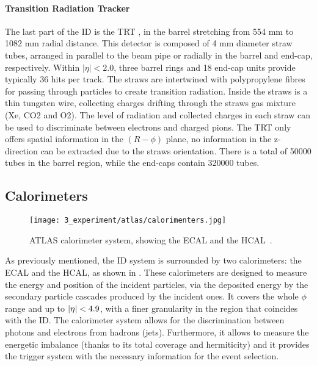 \paragraph{Transition Radiation Tracker}
The last part of the \ac{ID} is the \ac{TRT} \cite{TRTDesignPerformance}, in the barrel stretching from 554 mm to 1082 mm radial distance. This detector is composed of 4 mm diameter straw tubes, arranged in parallel to the beam pipe or radially in the barrel and end-cap, respectively. Within $|\eta| < 2.0$, three barrel rings and 18 end-cap units provide typically 36 hits per track. The straws are intertwined with polypropylene fibres for passing through particles to create transition radiation. Inside the straws is a thin tungsten wire, collecting charges drifting through the straws gas mixture (Xe, CO2 and O2). The level of radiation and collected charges in each straw can be used to discriminate between electrons and charged pions.  The \ac{TRT} only offers spatial information in the $(R-\phi)$ plane, no information in the z-direction can be extracted due to the straws orientation. There is a total of 50000 tubes in the barrel region, while the end-caps contain 320000 tubes.








\subsection{Calorimeters}

\begin{figure}[ht!]
    \centering
    \texttt{[image: 3\_experiment/atlas/calorimenters.jpg]}
    \caption{\ac{ATLAS} calorimeter system, showing the \acf{ECAL} and the \acf{HCAL}~\cite{ATLASCalorimeterDiagram}.}
    \label{fig:atlas:atlas:atlas_calorimeters}
\end{figure}

As previously mentioned, the \ac{ID} system is surrounded by two calorimeters: the \acf{ECAL} and the \acf{HCAL}, as shown in \Fig{\ref{fig:atlas:atlas:atlas_calorimeters}}. These calorimeters are designed to measure the energy and position of the incident particles, via the deposited energy by the secondary particle cascades produced by the incident ones. It covers the whole \(\phi\) range and up to \(|\eta|<4.9\), with a finer granularity in the region that coincides with the \ac{ID}.
The calorimeter system allows for the discrimination between photons and electrons from hadrons (jets). Furthermore, it allows to measure the energetic imbalance (thanks to its total coverage and hermiticity) and it provides the trigger system with the necessary information for the event selection.

